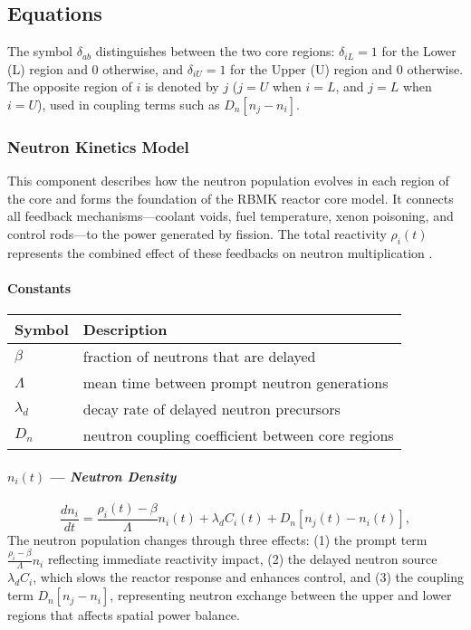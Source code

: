 \documentclass[11pt]{article}
\begin{document}
\subsection{Equations}
The symbol $\delta_{ab}$ distinguishes between the two core regions: $\delta_{iL}=1$ for the Lower (L) region and $0$ otherwise, and $\delta_{iU}=1$ for the Upper (U) region and $0$ otherwise. The opposite region of $i$ is denoted by $j$ ($j=U$ when $i=L$, and $j=L$ when $i=U$), used in coupling terms such as $D_n[n_j - n_i]$.

\subsubsection{Neutron Kinetics Model}
This component describes how the neutron population evolves in each region of the core and forms the foundation of the RBMK reactor core model. It connects all feedback mechanisms—coolant voids, fuel temperature, xenon poisoning, and control rods—to the power generated by fission. The total reactivity $\rho_i(t)$ represents the combined effect of these feedbacks on neutron multiplication \cite{Duderstadt1976,Lewis2008,NP_PointKinetics}.
\paragraph{\textbf{Constants}}
\begin{center}
\begin{tabular}{@{}ll@{}}
\toprule
\textbf{Symbol} & \textbf{Description} \\
\midrule
$\beta$ & fraction of neutrons that are delayed \\
$\Lambda$ & mean time between prompt neutron generations \\
$\lambda_d$ & decay rate of delayed neutron precursors \\
$D_n$ & neutron coupling coefficient between core regions \\
\bottomrule
\end{tabular}
\end{center}

\paragraph{\textbf{$n_i(t)$ --- \textit{Neutron Density}}}
\begin{equation}
\frac{d n_i}{d t} =
\frac{\rho_i(t) - \beta}{\Lambda} n_i(t)
+ \lambda_d C_i(t)
+ D_n [n_j(t) - n_i(t)],
\label{eq:neutron_density}
\end{equation}
The neutron population changes through three effects:
(1) the prompt term $\frac{\rho_i - \beta}{\Lambda} n_i$ reflecting immediate reactivity impact,
(2) the delayed neutron source $\lambda_d C_i$, which slows the reactor response and enhances control, and
(3) the coupling term $D_n [n_j - n_i]$, representing neutron exchange between the upper and lower regions that affects spatial power balance.
\end{document}
